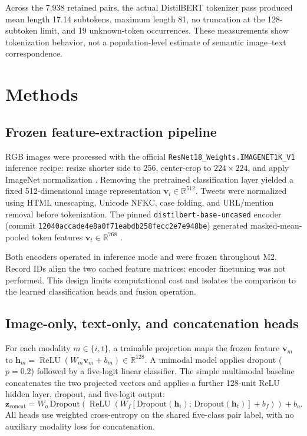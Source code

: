 \documentclass[11pt,a4paper]{article}
\begin{document}
Across the 7,938 retained pairs, the actual DistilBERT tokenizer pass produced mean length 17.14 subtokens, maximum length 81, no truncation at the 128-subtoken limit, and 19 unknown-token occurrences. These measurements show tokenization behavior, not a population-level estimate of semantic image--text correspondence.

\section{Methods}
\subsection{Frozen feature-extraction pipeline}
RGB images were processed with the official \texttt{ResNet18\_Weights.IMAGENET1K\_V1} inference recipe: resize shorter side to 256, center-crop to $224\times224$, and apply ImageNet normalization \cite{he2016,torchvision2026}. Removing the pretrained classification layer yielded a fixed 512-dimensional image representation $\mathbf{v}_i\in\mathbb{R}^{512}$. Tweets were normalized using HTML unescaping, Unicode NFKC, case folding, and URL/mention removal before tokenization. The pinned \texttt{distilbert-base-uncased} encoder (commit \texttt{12040accade4e8a0f71eabdb}\allowbreak\texttt{258fecc2e7e948be}) generated masked-mean-pooled token features $\mathbf{v}_t\in\mathbb{R}^{768}$ \cite{sanh2019,distilbert2026}.

Both encoders operated in inference mode and were frozen throughout M2. Record IDs align the two cached feature matrices; encoder finetuning was not performed. This design limits computational cost and isolates the comparison to the learned classification heads and fusion operation.

\subsection{Image-only, text-only, and concatenation heads}
For each modality $m\in\{i,t\}$, a trainable projection maps the frozen feature $\mathbf{v}_m$ to $\mathbf{h}_m=\operatorname{ReLU}(W_m\mathbf{v}_m+b_m)\in\mathbb{R}^{128}$. A unimodal model applies dropout ($p=0.2$) followed by a five-logit linear classifier. The simple multimodal baseline concatenates the two projected vectors and applies a further 128-unit ReLU hidden layer, dropout, and five-logit output:
\begin{equation}
\mathbf{z}_{\mathrm{concat}} = W_o\,\mathrm{Dropout}\!\left(\operatorname{ReLU}\!\left(W_f[\mathrm{Dropout}(\mathbf{h}_i);\,\mathrm{Dropout}(\mathbf{h}_t)]+b_f\right)\right)+b_o.
\label{eq:fusion}
\end{equation}
All heads use weighted cross-entropy on the shared five-class pair label, with no auxiliary modality loss for concatenation.
\end{document}
